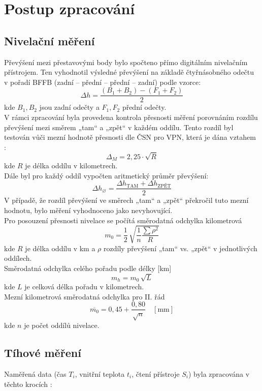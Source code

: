 \section{Postup zpracování}

\subsection{Nivelační měření}

Převýšení mezi přestavovými body bylo spočteno přímo digitálním nivelačním přístrojem. Ten vyhodnotil výsledné převýšení na základě čtyřnásobného odečtu v pořadí BFFB (zadní – přední – přední – zadní) podle vzorce:
\[
\Delta h = \frac{(B_1 + B_2) - (F_1 + F_2)}{2}
\]
kde \( B_1, B_2 \) jsou zadní odečty a \( F_1, F_2 \) přední odečty.\\
V rámci zpracování byla provedena kontrola přesnosti měření porovnáním rozdílu převýšení mezi směrem „tam“ a „zpět“ v každém oddílu. Tento rozdíl byl testován vůči mezní hodnotě přesnosti dle ČSN pro VPN, která je dána vztahem \cite{skorepa}:
\[
\Delta_M = 2,25 \cdot \sqrt{R}
\]
kde \( R \) je délka oddílu v kilometrech.\\
Dále byl pro každý oddíl vypočten aritmetický průměr převýšení:
\[
\Delta h_{\diameter} = \frac{\Delta h_{\text{TAM}} + \Delta h_{\text{ZPĚT}}}{2}
\]
V případě, že rozdíl převýšení ve směrech „tam“ a „zpět“ překročil tuto mezní hodnotu, bylo měření vyhodnoceno jako nevyhovující.\cite{zadani}\\
Pro posouzení přesnosti nivelace se počítá směrodatná odchylka kilometrová
\[
  m_0 = \frac{1}{2}\,\sqrt{\frac{1}{n}\frac{\sum\rho^2}{R}}
\]
kde \( R \) je délka oddílu v km a \(\rho\) rozdíly převýšení „tam“ vs. „zpět“ v jednotlivých oddílech.\\
Směrodatná odchylka celého pořadu podle délky [km]
\[
  m_h = m_0 \,\sqrt{L}
\]
kde \(L\) je celková délka pořadu v kilometrech.\\
Mezní kilometrová směrodatná odchylka pro II. řád
\[
  \overline{m_0} = 0{,}45 + \frac{0{,}80}{\sqrt{n}}\quad [\mathrm{mm}]
\]
kde \(n\) je počet oddílů nivelace.

\subsection{Tíhové měření}

Naměřená data (čas \(T_i\), vnitřní teplota \(t_i\), čtení přístroje \(S_i\)) byla zpracována v těchto krocích \cite{gravi}:

